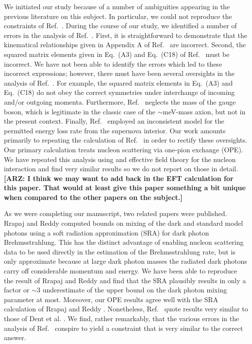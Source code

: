 \documentclass[nofootinbib,prd,superscriptaddress,twocolumn]{revtex4}
\newcommand{\arz}[1]{{{\bf{\color{BrickRed}[ARZ: #1]}}}}
\begin{document}
We initiated our study because of a number of ambiguities appearing in the previous literature on this subject. 
In particular, we could not reproduce the constraints of Ref.~\cite{dent_etal12}. During the course of our 
study, we identified a number of errors in the analysis of Ref.~\cite{dent_etal12}. First, it is straightforward 
to demonstrate that the kinematical relationships given in Appendix A of Ref.~\cite{dent_etal12} are 
incorrect. Second, the squared matrix elements given in Eq.~(A3) and Eq.~(C18) of Ref.~\cite{dent_etal12} must 
be incorrect. We have not been able to identify the errors which led to these incorrect expressions; however, 
there must have been several oversights in the analysis of Ref.~\cite{dent_etal12}. For example, the squared 
matrix elements in Eq.~(A3) and Eq.~(C18) do not obey the correct symmetries under interchange of incoming 
and/or outgoing momenta. Furthermore, Ref.~\cite{dent_etal12} neglects the mass of the gauge boson, which 
is legitimate in the classic case of the $\sim$meV-mass axion, but not in the present context. Finally, Ref.~\cite{dent_etal12} 
employed an inconsistent model for the permitted energy loss rate from the supernova interior. Our work amounts 
primarily to repeating the calculation of Ref.~\cite{dent_etal12} in order to rectify these oversights. Our primary 
calculation treats nucleon scattering via one-pion exchange (OPE). We have repeated this analysis 
using and effective field theory for the nucleon interaction and find very similar results so we do not 
report on those in detail. \arz{I think we may want to add back in the EFT calculation for this paper. 
That would at least give this paper something a bit unique when compared to the other papers on 
the subject.}


As we were completing our manuscript, two related papers were published. Rrapaj and Reddy \cite{rrapaj_reddy16} 
computed bounds on mixing of the dark and standard model photons using a soft radiation approximation (SRA) 
for dark photon Brehmsstrahlung. This has the distinct advantage of enabling nucleon scattering data to be used 
directly in the estimation of the Brehmsstrahlung rate, but is only approximate because at large dark photon masses 
the radiated dark photons carry off considerable momentum and energy. We have been able to reproduce the 
result of Rrapaj and Reddy \cite{rrapaj_reddy16} and find that the SRA plausibly results in only a factor or 
$\sim 3$ underestimate of the upper bound on the dark photon mixing parameter at most. Moreover, 
our OPE results agree well with the SRA calculation of Rrapaj and Reddy \cite{rrapaj_reddy16}. Nonetheless, 
Ref.~\cite{rrapaj_reddy16} quote results very similar to those of Dent et al. \cite{dent_etal12}. We find, 
rather remarkably, that the various errors in the analysis of Ref.~\cite{dent_etal12} conspire to yield a constraint that 
is very similar to the correct answer. 
\end{document}
